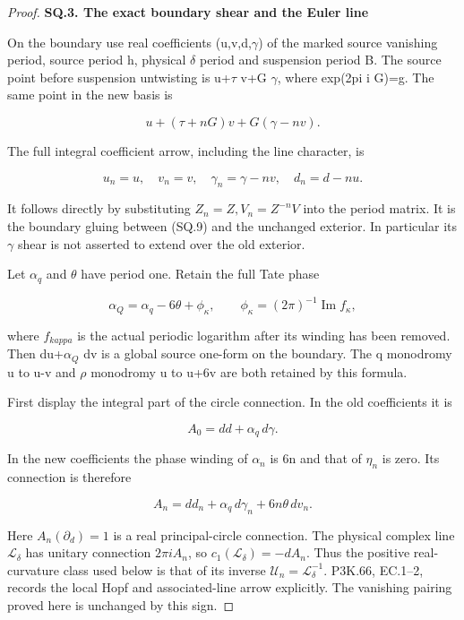 \begin{proof}
\par

\medskip\noindent\textbf{SQ.3. The exact boundary shear and the Euler line}

\par\nobreak

On the boundary use real coefficients (u,v,d,\(\gamma\)) of the marked
source vanishing period, source period h, physical \(\delta\) period and
suspension period B. The source point before suspension untwisting is
u+\(\tau\) v+G \(\gamma\), where exp(2pi i G)=g. The same point in the new
basis is

\[
 u+(\tau+nG)v+G(\gamma-nv).
\]

The full integral coefficient arrow, including the line character,
is

\[
 u_n=u,\quad v_n=v,\quad
 \gamma_n=\gamma-nv,\quad d_n=d-nu.                   \tag{SQ.10}
\]

It follows directly by substituting \(Z_n=Z,V_n=Z^{-n}V\) into the
period matrix. It is the boundary gluing between (SQ.9) and the
unchanged exterior. In particular its \(\gamma\) shear is not asserted to
extend over the old exterior.

Let \(\alpha_{q}\) and \(\theta\) have period one. Retain the full Tate phase

\[
 \alpha_Q=\alpha_q-6\theta+\phi_\kappa,
 \qquad \phi_\kappa=(2\pi)^{-1}\operatorname{Im}f_\kappa,
                                                        \tag{SQ.11}
\]

where \(f_{kappa}\) is the actual periodic logarithm after its winding has
been removed. Then du+\(\alpha_{Q}\) dv is a global source one-form on the
boundary. The q monodromy u to u-v and \(\rho\) monodromy u to u+6v
are both retained by this formula.

First display the integral part of the circle connection. In the
old coefficients it is

\[
 A_0=dd+\alpha_q\,d\gamma.
\]

In the new coefficients the phase winding of \(\alpha_{n}\) is 6n and
that of \(\eta_{n}\) is zero. Its connection is therefore

\[
 A_n=dd_n+\alpha_q\,d\gamma_n+6n\theta\,dv_n.
                                                        \tag{SQ.12}
\]

Here \(A_n(\partial_d)=1\) is a real principal-circle
connection. The physical complex line \(\mathcal L_\delta\) has
unitary connection \(2\pi iA_n\), so
\(c_1(\mathcal L_\delta)=-dA_n\). Thus the positive real-curvature
class used below is that of its inverse
\(\mathcal U_n=\mathcal L_\delta^{-1}\). P3K.66, EC.1--2,
records the local Hopf and associated-line arrow explicitly.
The vanishing pairing proved here is unchanged by this sign.


\end{proof}
